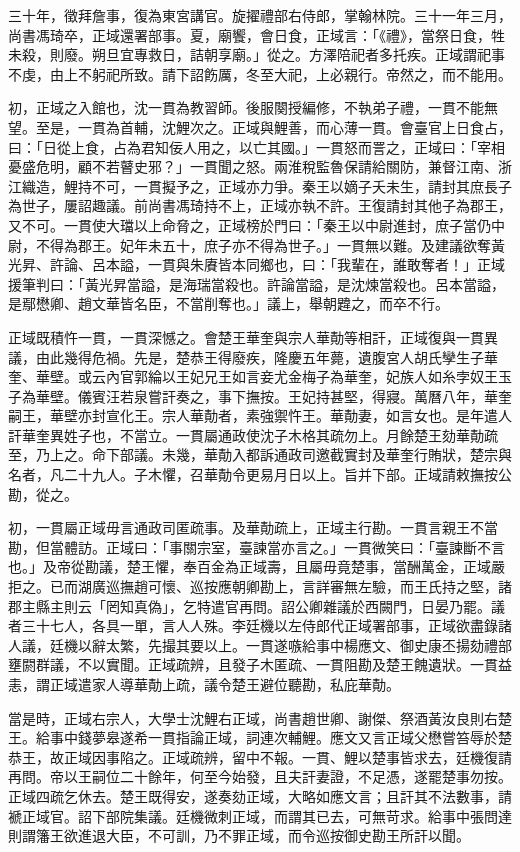 \begin{pinyinscope}
三十年，徵拜詹事，復為東宮講官。旋擢禮部右侍郎，掌翰林院。三十一年三月，尚書馮琦卒，正域還署部事。夏，廟饗，會日食，正域言：「《禮》，當祭日食，牲未殺，則廢。朔旦宜專救日，詰朝享廟。」從之。方澤陪祀者多托疾。正域謂祀事不虔，由上不躬祀所致。請下詔飭厲，冬至大祀，上必親行。帝然之，而不能用。

初，正域之入館也，沈一貫為教習師。後服闋授編修，不執弟子禮，一貫不能無望。至是，一貫為首輔，沈鯉次之。正域與鯉善，而心薄一貫。會臺官上日食占，曰：「日從上食，占為君知佞人用之，以亡其國。」一貫怒而詈之，正域曰：「宰相憂盛危明，顧不若瞽史邪？」一貫聞之怒。兩淮稅監魯保請給關防，兼督江南、浙江織造，鯉持不可，一貫擬予之，正域亦力爭。秦王以嫡子夭未生，請封其庶長子為世子，屢詔趣議。前尚書馮琦持不上，正域亦執不許。王復請封其他子為郡王，又不可。一貫使大璫以上命脅之，正域榜於門曰：「秦王以中尉進封，庶子當仍中尉，不得為郡王。妃年未五十，庶子亦不得為世子。」一貫無以難。及建議欲奪黃光昇、許論、呂本謚，一貫與朱賡皆本同鄉也，曰：「我輩在，誰敢奪者！」正域援筆判曰：「黃光昇當謚，是海瑞當殺也。許論當謚，是沈煉當殺也。呂本當謚，是鄢懋卿、趙文華皆名臣，不當削奪也。」議上，舉朝韙之，而卒不行。

正域既積忤一貫，一貫深憾之。會楚王華奎與宗人華勣等相訐，正域復與一貫異議，由此幾得危禍。先是，楚恭王得廢疾，隆慶五年薨，遺腹宮人胡氏孿生子華奎、華壁。或云內官郭綸以王妃兄王如言妾尤金梅子為華奎，妃族人如糸孛奴王玉子為華壁。儀賓汪若泉嘗訐奏之，事下撫按。王妃持甚堅，得寢。萬曆八年，華奎嗣王，華壁亦封宣化王。宗人華勣者，素強禦忤王。華勣妻，如言女也。是年遣人訐華奎異姓子也，不當立。一貫屬通政使沈子木格其疏勿上。月餘楚王劾華勣疏至，乃上之。命下部議。未幾，華勣入都訴通政司邀截實封及華奎行賄狀，楚宗與名者，凡二十九人。子木懼，召華勣令更易月日以上。旨并下部。正域請敕撫按公勘，從之。

初，一貫屬正域毋言通政司匿疏事。及華勣疏上，正域主行勘。一貫言親王不當勘，但當體訪。正域曰：「事關宗室，臺諫當亦言之。」一貫微笑曰：「臺諫斷不言也。」及帝從勘議，楚王懼，奉百金為正域壽，且屬毋竟楚事，當酬萬金，正域嚴拒之。已而湖廣巡撫趙可懷、巡按應朝卿勘上，言詳審無左驗，而王氏持之堅，諸郡主縣主則云「罔知真偽」，乞特遣官再問。詔公卿雜議於西闕門，日晏乃罷。議者三十七人，各具一單，言人人殊。李廷機以左侍郎代正域署部事，正域欲盡錄諸人議，廷機以辭太繁，先撮其要以上。一貫遂嗾給事中楊應文、御史康丕揚劾禮部壅閼群議，不以實聞。正域疏辨，且發子木匿疏、一貫阻勘及楚王餽遺狀。一貫益恚，謂正域遣家人導華勣上疏，議令楚王避位聽勘，私庇華勣。

當是時，正域右宗人，大學士沈鯉右正域，尚書趙世卿、謝傑、祭酒黃汝良則右楚王。給事中錢夢皋遂希一貫指論正域，詞連次輔鯉。應文又言正域父懋嘗笞辱於楚恭王，故正域因事陷之。正域疏辨，留中不報。一貫、鯉以楚事皆求去，廷機復請再問。帝以王嗣位二十餘年，何至今始發，且夫訐妻證，不足憑，遂罷楚事勿按。正域四疏乞休去。楚王既得安，遂奏劾正域，大略如應文言；且訐其不法數事，請褫正域官。詔下部院集議。廷機微刺正域，而謂其已去，可無苛求。給事中張問達則謂籓王欲進退大臣，不可訓，乃不罪正域，而令巡按御史勘王所訐以聞。


\end{pinyinscope}

